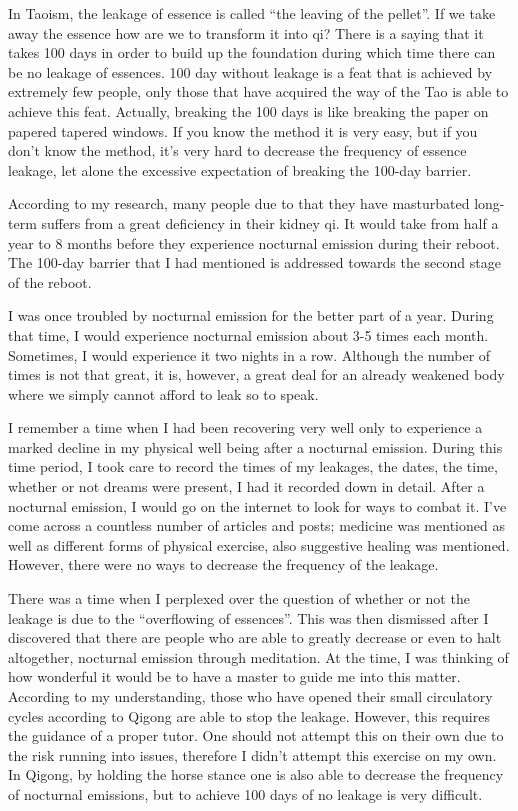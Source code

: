 \documentclass[
]{book}
\begin{document}
In Taoism, the leakage of essence is called ``the leaving of the pellet''. If we take away the essence how are we to transform it into qi? There is a saying that it takes 100 days in order to build up the foundation during which time there can be no leakage of essences. 100 day without leakage is a feat that is achieved by extremely few people, only those that have acquired the way of the Tao is able to achieve this feat. Actually, breaking the 100 days is like breaking the paper on papered tapered windows. If you know the method it is very easy, but if you don't know the method, it's very hard to decrease the frequency of essence leakage, let alone the excessive expectation of breaking the 100-day barrier.

According to my research, many people due to that they have masturbated long-term suffers from a great deficiency in their kidney qi. It would take from half a year to 8 months before they experience nocturnal emission during their reboot. The 100-day barrier that I had mentioned is addressed towards the second stage of the reboot.

I was once troubled by nocturnal emission for the better part of a year. During that time, I would experience nocturnal emission about 3-5 times each month. Sometimes, I would experience it two nights in a row. Although the number of times is not that great, it is, however, a great deal for an already weakened body where we simply cannot afford to leak so to speak.

I remember a time when I had been recovering very well only to experience a marked decline in my physical well being after a nocturnal emission. During this time period, I took care to record the times of my leakages, the dates, the time, whether or not dreams were present, I had it recorded down in detail. After a nocturnal emission, I would go on the internet to look for ways to combat it. I've come across a countless number of articles and posts; medicine was mentioned as well as different forms of physical exercise, also suggestive healing was mentioned. However, there were no ways to decrease the frequency of the leakage.

There was a time when I perplexed over the question of whether or not the leakage is due to the ``overflowing of essences''. This was then dismissed after I discovered that there are people who are able to greatly decrease or even to halt altogether, nocturnal emission through meditation. At the time, I was thinking of how wonderful it would be to have a master to guide me into this matter. According to my understanding, those who have opened their small circulatory cycles according to Qigong are able to stop the leakage. However, this requires the guidance of a proper tutor. One should not attempt this on their own due to the risk running into issues, therefore I didn't attempt this exercise on my own. In Qigong, by holding the horse stance one is also able to decrease the frequency of nocturnal emissions, but to achieve 100 days of no leakage is very difficult.
\end{document}
